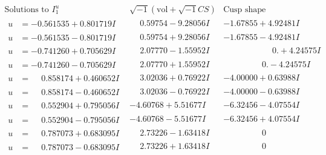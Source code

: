 \documentclass[1p]{elsarticle_modified}
\theoremstyle{definition}
\newcommand{\I}{\sqrt{-1}}
\begin{document}
$$\begin{array}{c|c|c}  
\text{Solutions to }I^u_{1}& \I (\text{vol} + \sqrt{-1}CS) & \text{Cusp shape}\\
 \hline 
\begin{aligned}
u &= -0.561535 + 0.801719 I\end{aligned}
 & \phantom{-}0.59754 - 9.28056 I & -1.67855 + 4.92481 I \\ \hline\begin{aligned}
u &= -0.561535 - 0.801719 I\end{aligned}
 & \phantom{-}0.59754 + 9.28056 I & -1.67855 - 4.92481 I \\ \hline\begin{aligned}
u &= -0.741260 + 0.705629 I\end{aligned}
 & \phantom{-}2.07770 - 1.55952 I & \phantom{-0.000000 -}0. + 4.24575 I \\ \hline\begin{aligned}
u &= -0.741260 - 0.705629 I\end{aligned}
 & \phantom{-}2.07770 + 1.55952 I & \phantom{-0.000000 } 0. - 4.24575 I \\ \hline\begin{aligned}
u &= \phantom{-}0.858174 + 0.460652 I\end{aligned}
 & \phantom{-}3.02036 + 0.76922 I & -4.00000 + 0.63988 I \\ \hline\begin{aligned}
u &= \phantom{-}0.858174 - 0.460652 I\end{aligned}
 & \phantom{-}3.02036 - 0.76922 I & -4.00000 - 0.63988 I \\ \hline\begin{aligned}
u &= \phantom{-}0.552904 + 0.795056 I\end{aligned}
 & -4.60768 + 5.51677 I & -6.32456 - 4.07554 I \\ \hline\begin{aligned}
u &= \phantom{-}0.552904 - 0.795056 I\end{aligned}
 & -4.60768 - 5.51677 I & -6.32456 + 4.07554 I \\ \hline\begin{aligned}
u &= \phantom{-}0.787073 + 0.683095 I\end{aligned}
 & \phantom{-}2.73226 - 1.63418 I & \phantom{-0.000000 } 0 \\ \hline\begin{aligned}
u &= \phantom{-}0.787073 - 0.683095 I\end{aligned}
 & \phantom{-}2.73226 + 1.63418 I & \phantom{-0.000000 } 0 \\ \hline\begin{aligned}

\end{aligned}
\end{array}$$
\end{document}
